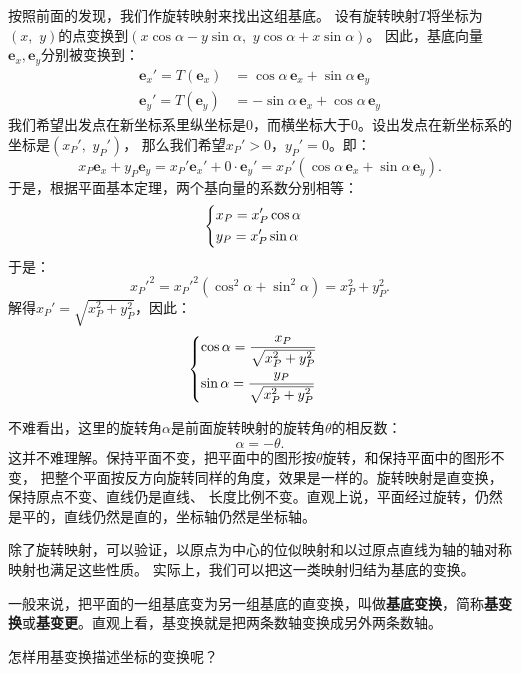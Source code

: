 \documentclass[12pt,UTF8]{ctexbook}
\begin{document}
按照前面的发现，我们作旋转映射来找出这组基底。
设有旋转映射$T$将坐标为$(x,\,\, y)$的点变换到$(x\cos{\alpha} - y\sin{\alpha},\,\,y\cos{\alpha} + x\sin{\alpha})$。
因此，基底向量$\mathbf{e}_x, \mathbf{e}_y$分别被变换到：
\begin{align*}
    \mathbf{e}_x' = T(\mathbf{e}_x) &= \cos{\alpha}\,\mathbf{e}_x + \sin{\alpha}\,\mathbf{e}_y  \\
    \mathbf{e}_y' = T(\mathbf{e}_y) &= -\sin{\alpha}\,\mathbf{e}_x + \cos{\alpha}\,\mathbf{e}_y  
\end{align*}
我们希望出发点在新坐标系里纵坐标是$0$，而横坐标大于$0$。设出发点在新坐标系的坐标是$(x_P', \,\, y_P')$，
那么我们希望$x_P' > 0$，$y_P' = 0$。即：
$$ x_P\mathbf{e}_x + y_P\mathbf{e}_y = x_P' \mathbf{e}_x' + 0 \cdot \mathbf{e}_y' = x_P' (\cos{\alpha}\,\mathbf{e}_x + \sin{\alpha}\,\mathbf{e}_y). $$
于是，根据平面基本定理，两个基向量的系数分别相等：
\begin{alignat*}{1}
&   \begin{dcases}
        x_P = x_P' \cos{\alpha} \\
        y_P = x_P' \sin{\alpha} 
    \end{dcases}
\end{alignat*}
于是：
$$ x_P'^2 = x_P'^2 (\cos^2{\alpha} + \sin^2{\alpha}) = x_P^2 + y_P^2. $$
解得$x_P' = \sqrt{x_P^2 + y_P^2}$，因此：
\begin{alignat*}{1}
&   \begin{dcases}
        \cos{\alpha} = \frac{x_P}{\sqrt{x_P^2 + y_P^2}} \\
        \sin{\alpha} = \frac{y_P}{\sqrt{x_P^2 + y_P^2}} 
    \end{dcases}
\end{alignat*}

不难看出，这里的旋转角$\alpha$是前面旋转映射的旋转角$\theta$的相反数：
$$ \alpha = -\theta.$$
这并不难理解。保持平面不变，把平面中的图形按$\theta$旋转，和保持平面中的图形不变，
把整个平面按反方向旋转同样的角度，效果是一样的。旋转映射是直变换，保持原点不变、直线仍是直线、
长度比例不变。直观上说，平面经过旋转，仍然是平的，直线仍然是直的，坐标轴仍然是坐标轴。

除了旋转映射，可以验证，以原点为中心的位似映射和以过原点直线为轴的轴对称映射也满足这些性质。
实际上，我们可以把这一类映射归结为基底的变换。

一般来说，把平面的一组基底变为另一组基底的直变换，叫做\textbf{基底变换}，简称\textbf{基变换}或\textbf{基变更}。直观上看，基变换就是把两条数轴变换成另外两条数轴。

怎样用基变换描述坐标的变换呢？
\end{document}
